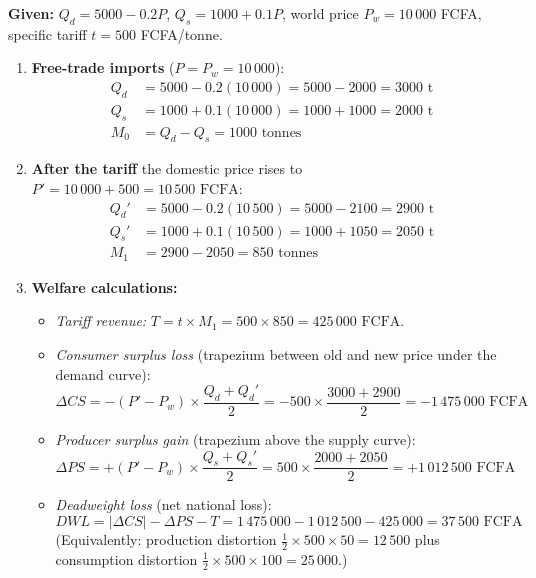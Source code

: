 \documentclass[11pt]{article}
\begin{document}
\begin{corrige}
\textbf{Given:} $Q_d = 5000 - 0.2P$, $Q_s = 1000 + 0.1P$, world price $P_w = 10\,000$ FCFA, specific tariff $t = 500$ FCFA/tonne.

\begin{enumerate}
\item \textbf{Free-trade imports} ($P = P_w = 10\,000$):
\begin{align*}
Q_d &= 5000 - 0.2(10\,000) = 5000 - 2000 = 3000 \text{ t}\\
Q_s &= 1000 + 0.1(10\,000) = 1000 + 1000 = 2000 \text{ t}\\
M_0 &= Q_d - Q_s = \boxed{1000 \text{ tonnes}}
\end{align*}

\item \textbf{After the tariff} the domestic price rises to $P' = 10\,000 + 500 = \boxed{10\,500 \text{ FCFA}}$:
\begin{align*}
Q_d' &= 5000 - 0.2(10\,500) = 5000 - 2100 = \boxed{2900 \text{ t}}\\
Q_s' &= 1000 + 0.1(10\,500) = 1000 + 1050 = \boxed{2050 \text{ t}}\\
M_1 &= 2900 - 2050 = \boxed{850 \text{ tonnes}}
\end{align*}

\item \textbf{Welfare calculations:}
\begin{itemize}
\item \emph{Tariff revenue:} $T = t \times M_1 = 500 \times 850 = \boxed{425\,000 \text{ FCFA}}$.
\item \emph{Consumer surplus loss} (trapezium between old and new price under the demand curve):
\[ \Delta CS = -(P'-P_w)\times\frac{Q_d + Q_d'}{2} = -500\times\frac{3000+2900}{2} = \boxed{-1\,475\,000 \text{ FCFA}} \]
\item \emph{Producer surplus gain} (trapezium above the supply curve):
\[ \Delta PS = +(P'-P_w)\times\frac{Q_s + Q_s'}{2} = 500\times\frac{2000+2050}{2} = \boxed{+1\,012\,500 \text{ FCFA}} \]
\item \emph{Deadweight loss} (net national loss):
\[ DWL = |\Delta CS| - \Delta PS - T = 1\,475\,000 - 1\,012\,500 - 425\,000 = \boxed{37\,500 \text{ FCFA}} \]
(Equivalently: production distortion $\tfrac{1}{2}\times 500 \times 50 = 12\,500$ plus consumption distortion $\tfrac{1}{2}\times 500 \times 100 = 25\,000$.)
\end{itemize}


\end{enumerate}
\end{corrige}
\end{document}
